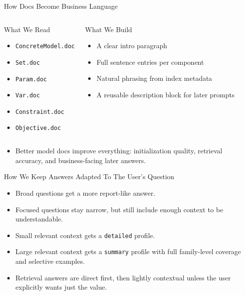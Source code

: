 \documentclass[10pt]{beamer}
\newcommand{\goodbox}[2]{
  \begin{block}{#1}
  #2
  \end{block}
}
\newcommand{\func}[1]{\texttt{#1}}
\begin{document}
\begin{frame}{How Docs Become Business Language}
  \begin{columns}[T]
    \goodbox{What We Read}{
      \begin{itemize}
        \item \func{ConcreteModel.doc}
        \item \func{Set.doc}
        \item \func{Param.doc}
        \item \func{Var.doc}
        \item \func{Constraint.doc}
        \item \func{Objective.doc}
      \end{itemize}
    }
    \goodbox{What We Build}{
      \begin{itemize}
        \item A clear intro paragraph
        \item Full sentence entries per component
        \item Natural phrasing from index metadata
        \item A reusable description block for later prompts
      \end{itemize}
    }
  \end{columns}
  \vspace{0.5em}
  \begin{itemize}
    \item Better model docs improve everything: initialization quality, retrieval accuracy, and business-facing later answers.
  \end{itemize}
\end{frame}

\begin{frame}{How We Keep Answers Adapted To The User's Question}
  \begin{itemize}
    \item Broad questions get a more report-like answer.
    \item Focused questions stay narrow, but still include enough context to be understandable.
    \item Small relevant context gets a \func{detailed} profile.
    \item Large relevant context gets a \func{summary} profile with full family-level coverage and selective examples.
    \item Retrieval answers are direct first, then lightly contextual unless the user explicitly wants just the value.
  \end{itemize}
\end{frame}
\end{document}
